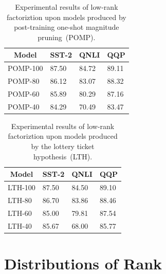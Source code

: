 \documentclass[letterpaper]{article} %
\begin{document}
	\begin{table}[h!]
		\centering
		\footnotesize
		\begin{tabular}{l|l|lll}
			\toprule
			\multicolumn{2}{c|}{Model}                          & SST-2       & QNLI          & QQP           \\
			\midrule
			\multicolumn{2}{l|}{POMP-100}  &87.50       & 84.72     &89.11        \\
			\multicolumn{2}{l|}{POMP-80}  &86.12       &83.07      &88.32        \\
			\multicolumn{2}{l|}{POMP-60}  &85.89       &80.29      &87.16        \\
			\multicolumn{2}{l|}{POMP-40}  &84.29       &70.49      &83.47        \\
			\bottomrule
		\end{tabular}
		\caption{Experimental results of low-rank factoriztion upon models produced by post-training one-shot magnitude pruning~(POMP).}
		\label{table:pomp}
	\end{table}
	
	\begin{table}[h!]
		\centering
		\footnotesize
		\begin{tabular}{l|l|lll}
			\toprule
			\multicolumn{2}{c|}{Model}                          & SST-2       & QNLI          & QQP           \\
			\midrule
			\multicolumn{2}{l|}{LTH-100}  &87.50       &84.50      &89.10        \\
			\multicolumn{2}{l|}{LTH-80}  &86.70       &83.86      &88.46        \\
			\multicolumn{2}{l|}{LTH-60}  &85.00       &79.81      &87.54        \\
			\multicolumn{2}{l|}{LTH-40}  &85.67       &68.00      &85.77        \\
			\bottomrule
		\end{tabular}
		\caption{Experimental results of low-rank factoriztion upon models produced by the lottery ticket hypothesis~(LTH).}
		\label{table:lth}
	\end{table}
	
	\section{Distributions of Rank}
	\label{sec:appendixA}
	
\end{document}
